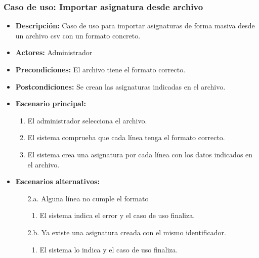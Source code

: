 \documentclass{book}
\begin{document}
\subsubsection*{Caso de uso: Importar asignatura desde archivo}
\begin{itemize}
\item{\bf Descripción:} Caso de uso para importar asignaturas de forma masiva desde un archivo csv con un formato concreto.
\item{\bf Actores:} Administrador
\item{\bf Precondiciones:} El archivo tiene el formato correcto.
\item{\bf Postcondiciones:} Se crean las asignaturas indicadas en el archivo.
\item{\bf Escenario principal:}
	\begin{enumerate}
	\item El administrador selecciona el archivo.
	\item El sistema comprueba que cada línea tenga el formato correcto.
	\item El sistema crea una asignatura por cada línea con los datos indicados en el archivo.
	\end{enumerate}
\item{\bf Escenarios alternativos:}
	\begin{itemize}
		\item[2.a.] Alguna línea no cumple el formato
		\begin{enumerate}
			\item El sistema indica el error y el caso de uso finaliza.
		\end{enumerate}
		\item[2.b.] Ya existe una asignatura creada con el mismo identificador.
		\begin{enumerate}
			\item El sistema lo indica y el caso de uso finaliza.
		\end{enumerate}
	\end{itemize}
\end{itemize}

\pagebreak
\end{document}
